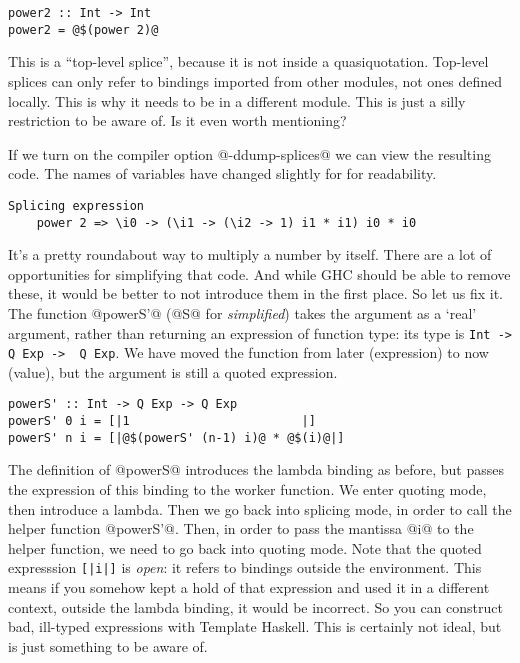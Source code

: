\begin{lstlisting}
power2 :: Int -> Int
power2 = @$(power 2)@
\end{lstlisting}

This is a ``top-level splice'', because it is not inside a quasiquotation.
Top-level splices can only refer to bindings imported from other modules, not ones defined locally.
This is why it needs to be in a different module.
This is just a silly restriction to be aware of. Is it even worth mentioning?

If we turn on the compiler option @-ddump-splices@ we can view the resulting code.
The names of variables have changed slightly for for readability.

\begin{lstlisting}
Splicing expression
    power 2 => \i0 -> (\i1 -> (\i2 -> 1) i1 * i1) i0 * i0
\end{lstlisting}

It's a pretty roundabout way to multiply a number by itself. There are a lot of opportunities for simplifying that code. And while GHC should be able to remove these, it would be better to not introduce them in the first place.
So let us fix it.
The function @powerS'@ (@S@ for \emph{simplified}) takes the argument as a `real' argument, rather than returning an expression of function type: its type is \lstinline/Int ->  Q Exp ->  Q Exp/.
We have moved the function from later (expression) to now (value), but the argument is still a quoted expression.

\begin{lstlisting}
powerS' :: Int -> Q Exp -> Q Exp
powerS' 0 i = [|1                        |]
powerS' n i = [|@$(powerS' (n-1) i)@ * @$(i)@|]
\end{lstlisting}

The definition of @powerS@ introduces the lambda binding as before, but passes the expression of this binding to the worker function.
We enter quoting mode, then introduce a lambda. Then we go back into splicing mode, in order to call the helper function @powerS'@.
Then, in order to pass the mantissa @i@ to the helper function, we need to go back into quoting mode.
Note that the quoted expresssion \lstinline/[|i|]/ is \emph{open}: it refers to bindings outside the environment.
This means if you somehow kept a hold of that expression and used it in a different context, outside the lambda binding, it would be incorrect.
So you can construct bad, ill-typed expressions with Template Haskell. This is certainly not ideal, but is just something to be aware of.

